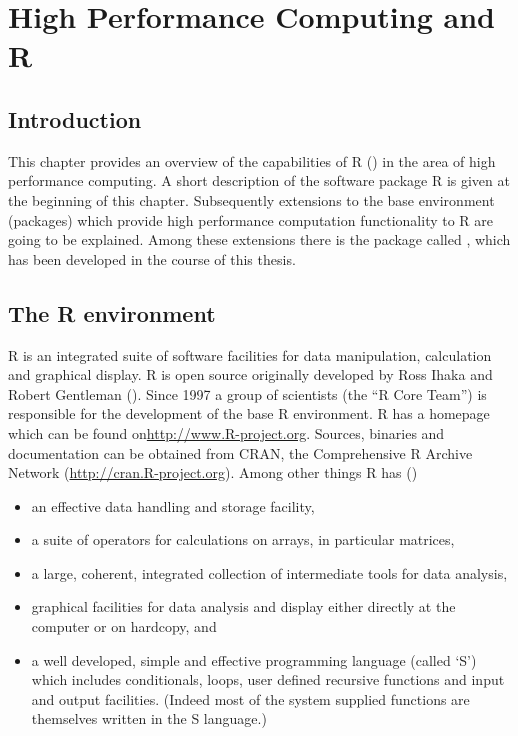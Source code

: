 \chapter{High Performance Computing and R}
\label{chap:Rhpc}
\section{Introduction}

This chapter provides an overview of the capabilities of R
(\cite{IntrotoR}) in the area 
of high performance computing. A short description of the
software package R is given at the beginning of this
chapter. Subsequently extensions to the base environment 
(packages) which provide high performance computation functionality to
R are going to be explained. Among these extensions there is the
package called , which has been developed in the course of
this thesis.

\section{The R environment}

R is an integrated suite of software facilities for data manipulation,
calculation and graphical display. R is open source originally
developed by Ross Ihaka and Robert Gentleman
(\cite{ihaka96rld}). Since 1997 a group of scientists (the
``R Core Team'') is responsible for the development of the base R
environment. R has a homepage
which can be found on\url{http://www.R-project.org}. Sources, binaries
and documentation can be obtained from CRAN, the Comprehensive R
Archive Network (\url{http://cran.R-project.org}). Among other things
R has (\cite{IntrotoR}) 
\begin{itemize}
\item an effective data handling and storage facility,
\item a suite of operators for calculations on arrays, in particular matrices,
\item a large, coherent, integrated collection of intermediate tools
  for data analysis,
\item graphical facilities for data analysis and display either
  directly at the computer or on hardcopy, and
\item a well developed, simple and effective programming language
  (called `S') which includes conditionals, loops, user defined
  recursive functions and input and output facilities. (Indeed most of
  the system supplied functions are themselves written in the S
  language.)
\end{itemize}

